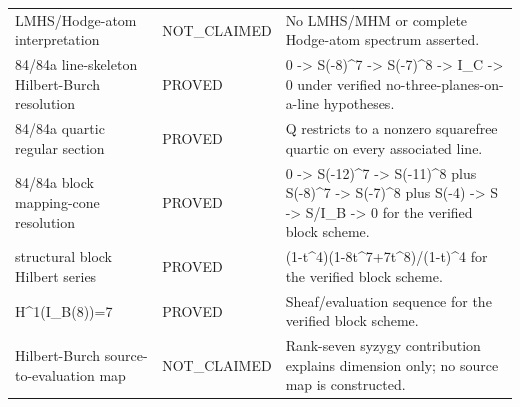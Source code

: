 \begin{tabular}{lll}
LMHS/Hodge-atom interpretation & NOT\_CLAIMED & No LMHS/MHM or complete Hodge-atom spectrum asserted. \\
84/84a line-skeleton Hilbert-Burch resolution & PROVED & 0 -> S(-8)^7 -> S(-7)^8 -> I\_C -> 0 under verified no-three-planes-on-a-line hypotheses. \\
84/84a quartic regular section & PROVED & Q restricts to a nonzero squarefree quartic on every associated line. \\
84/84a block mapping-cone resolution & PROVED & 0 -> S(-12)^7 -> S(-11)^8 plus S(-8)^7 -> S(-7)^8 plus S(-4) -> S -> S/I\_B -> 0 for the verified block scheme. \\
structural block Hilbert series & PROVED & (1-t^4)(1-8t^7+7t^8)/(1-t)^4 for the verified block scheme. \\
H^1(I\_B(8))=7 & PROVED & Sheaf/evaluation sequence for the verified block scheme. \\
Hilbert-Burch source-to-evaluation map & NOT\_CLAIMED & Rank-seven syzygy contribution explains dimension only; no source map is constructed. \\
\hline
\end{tabular}
